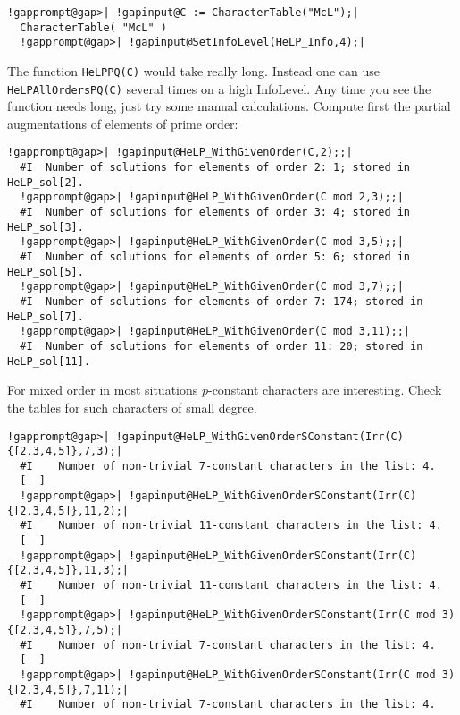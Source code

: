 \documentclass[a4paper,11pt]{report}
\begin{document}
{{ 
\begin{Verbatim}[commandchars=!@|,fontsize=\small,frame=single,label=Example]
  !gapprompt@gap>| !gapinput@C := CharacterTable("McL");|
  CharacterTable( "McL" )
  !gapprompt@gap>| !gapinput@SetInfoLevel(HeLP_Info,4);|
\end{Verbatim}
 The function \texttt{HeLP{\textunderscore}PQ(C)} would take really long. Instead one can use \texttt{HeLP{\textunderscore}AllOrdersPQ(C)} several times on a high InfoLevel. Any time you see the function needs long,
just try some manual calculations. Compute first the partial augmentations of
elements of prime order: 
\begin{Verbatim}[commandchars=!@|,fontsize=\small,frame=single,label=Example]
  !gapprompt@gap>| !gapinput@HeLP_WithGivenOrder(C,2);;|
  #I  Number of solutions for elements of order 2: 1; stored in HeLP_sol[2].    
  !gapprompt@gap>| !gapinput@HeLP_WithGivenOrder(C mod 2,3);;|
  #I  Number of solutions for elements of order 3: 4; stored in HeLP_sol[3].    
  !gapprompt@gap>| !gapinput@HeLP_WithGivenOrder(C mod 3,5);;|
  #I  Number of solutions for elements of order 5: 6; stored in HeLP_sol[5].    
  !gapprompt@gap>| !gapinput@HeLP_WithGivenOrder(C mod 3,7);;|
  #I  Number of solutions for elements of order 7: 174; stored in HeLP_sol[7].  
  !gapprompt@gap>| !gapinput@HeLP_WithGivenOrder(C mod 3,11);;|
  #I  Number of solutions for elements of order 11: 20; stored in HeLP_sol[11].
\end{Verbatim}
 For mixed order in most situations $p$-constant characters are interesting. Check the tables for such characters of
small degree. 
\begin{Verbatim}[commandchars=!@|,fontsize=\small,frame=single,label=Example]
  !gapprompt@gap>| !gapinput@HeLP_WithGivenOrderSConstant(Irr(C){[2,3,4,5]},7,3);|
  #I    Number of non-trivial 7-constant characters in the list: 4.
  [  ]
  !gapprompt@gap>| !gapinput@HeLP_WithGivenOrderSConstant(Irr(C){[2,3,4,5]},11,2);|
  #I    Number of non-trivial 11-constant characters in the list: 4.
  [  ]                                                                          
  !gapprompt@gap>| !gapinput@HeLP_WithGivenOrderSConstant(Irr(C){[2,3,4,5]},11,3);|
  #I    Number of non-trivial 11-constant characters in the list: 4.
  [  ]  
  !gapprompt@gap>| !gapinput@HeLP_WithGivenOrderSConstant(Irr(C mod 3){[2,3,4,5]},7,5);|
  #I    Number of non-trivial 7-constant characters in the list: 4.
  [  ]  
  !gapprompt@gap>| !gapinput@HeLP_WithGivenOrderSConstant(Irr(C mod 3){[2,3,4,5]},7,11);|
  #I    Number of non-trivial 7-constant characters in the list: 4.

\end{Verbatim}}}
\end{document}
